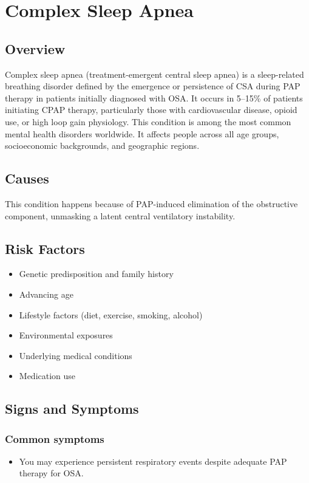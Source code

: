 \chapter{Complex Sleep Apnea}
\label{sec:Complex Sleep Apnea}

\section{Overview}
Complex sleep apnea (treatment-emergent central sleep apnea) is a sleep-related breathing disorder defined by the emergence or persistence of CSA during PAP therapy in patients initially diagnosed with OSA. It occurs in 5--15\% of patients initiating CPAP therapy, particularly those with cardiovascular disease, opioid use, or high loop gain physiology. This condition is among the most common mental health disorders worldwide. It affects people across all age groups, socioeconomic backgrounds, and geographic regions.
\section{Causes}
This condition happens because of PAP-induced elimination of the obstructive component, unmasking a latent central ventilatory instability.     
\section{Risk Factors}

\begin{itemize}[noitemsep]
  \item Genetic predisposition and family history
  \item Advancing age
  \item Lifestyle factors (diet, exercise, smoking, alcohol)
  \item Environmental exposures
  \item Underlying medical conditions
  \item Medication use
\end{itemize}
\section{Signs and Symptoms}

\subsection{Common symptoms}
\begin{itemize}[noitemsep]
  \item You may experience persistent respiratory events despite adequate PAP therapy for OSA. 
  \end{itemize}

